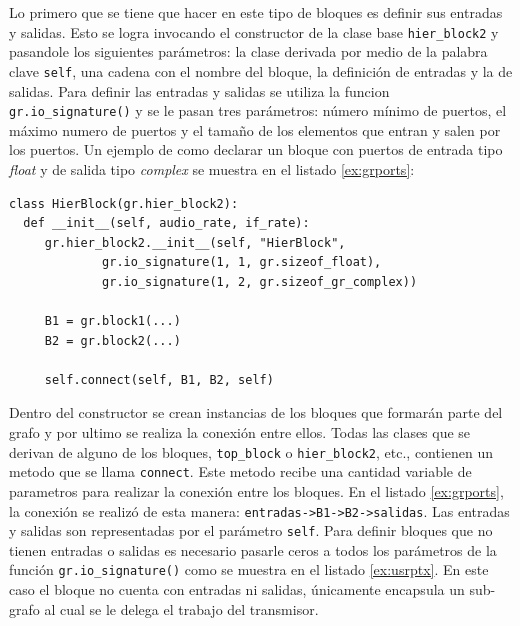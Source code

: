 Lo primero que se tiene que hacer en este tipo de bloques es definir sus entradas y salidas. Esto se
logra invocando el constructor de la clase base \verb|hier_block2| y pasandole los siguientes
par\'ametros: la clase derivada por medio de la palabra clave \verb|self|, una cadena con el nombre
del bloque, la definici\'on de entradas y la de salidas. Para definir las entradas y salidas se
utiliza la funcion \verb|gr.io_signature()| y se le pasan tres par\'ametros: n\'umero m\'inimo de
puertos, el m\'aximo numero de puertos y el tama\~no de los elementos que entran y salen por los
puertos. Un ejemplo de como declarar un bloque con puertos de entrada tipo \emph{float} y de salida
tipo \emph{complex} se muestra en el listado \ref{ex:grports}:

\begin{lstlisting}[float, frame=single, label=ex:grports, caption={Ejemplo de declaraci\'on de
entradas y salidas para un bloque jer\'arquico.}]
class HierBlock(gr.hier_block2):
  def __init__(self, audio_rate, if_rate):
     gr.hier_block2.__init__(self, "HierBlock",
             gr.io_signature(1, 1, gr.sizeof_float),
             gr.io_signature(1, 2, gr.sizeof_gr_complex))

     B1 = gr.block1(...)
     B2 = gr.block2(...)
 
     self.connect(self, B1, B2, self)
\end{lstlisting}

Dentro del constructor se crean instancias de los bloques que formar\'an parte del grafo y por
ultimo se realiza la conexi\'on entre ellos. Todas las clases que se derivan de alguno de los
bloques, \verb|top_block| o \verb|hier_block2|, etc., contienen un metodo que se llama
\verb|connect|. Este metodo recibe una cantidad variable de parametros para realizar la conexi\'on
entre los bloques. En el listado \ref{ex:grports}, la conexi\'on se realiz\'o de esta manera:
\verb|entradas->B1->B2->salidas|. Las entradas y salidas son representadas por el par\'ametro
\verb|self|. Para definir bloques que no tienen entradas o salidas es necesario pasarle ceros a
todos los par\'ametros de la funci\'on \verb|gr.io_signature()| como se muestra en el listado
\ref{ex:usrptx}. En este caso el bloque no cuenta con entradas ni salidas, \'unicamente encapsula un
sub-grafo al cual se le delega el trabajo del transmisor.

